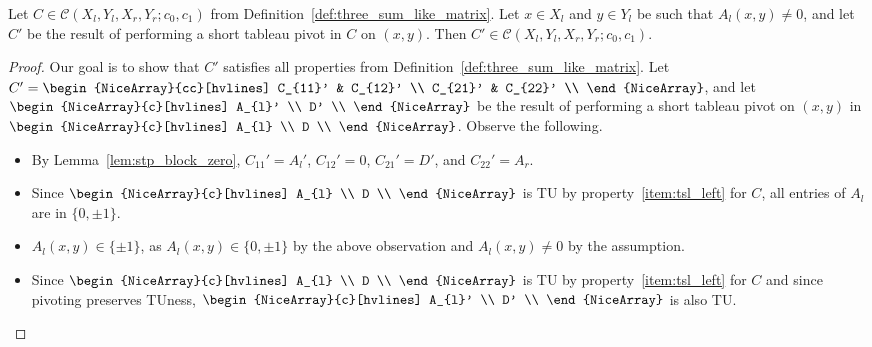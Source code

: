 \begin{lemma}\label{lem:three_sum_like_pivot}
    Let $C \in \mathcal{C} (X_{l}, Y_{l}, X_{r}, Y_{r}; c_{0}, c_{1})$ from Definition~\ref{def:three_sum_like_matrix}. Let $x \in X_{l}$ and $y \in Y_{l}$ be such that $A_{l} (x, y) \neq 0$, and let $C'$ be the result of performing a short tableau pivot in $C$ on $(x, y)$. Then $C' \in \mathcal{C} (X_{l}, Y_{l}, X_{r}, Y_{r}; c_{0}, c_{1})$.
\end{lemma}

\begin{proof}
    Our goal is to show that $C'$ satisfies all properties from Definition~\ref{def:three_sum_like_matrix}. Let $C' = \begin{NiceArray}{cc}[hvlines] C_{11}' & C_{12}' \\ C_{21}' & C_{22}' \\ \end{NiceArray}$, and let $\begin{NiceArray}{c}[hvlines] A_{l}' \\ D' \\ \end{NiceArray}$ be the result of performing a short tableau pivot on $(x, y)$ in $\begin{NiceArray}{c}[hvlines] A_{l} \\ D \\ \end{NiceArray}$. Observe the following.

    \begin{itemize}
        \item By Lemma~\ref{lem:stp_block_zero}, $C_{11}' = A_{l}'$, $C_{12}' = 0$, $C_{21}' = D'$, and $C_{22}' = A_{r}$.
        \item Since $\begin{NiceArray}{c}[hvlines] A_{l} \\ D \\ \end{NiceArray}$ is TU by property~\ref{item:tsl_left} for $C$, all entries of $A_{l}$ are in $\{0, \pm 1\}$.
        \item $A_{l} (x, y) \in \{\pm 1\}$, as $A_{l} (x, y) \in \{0, \pm 1\}$ by the above observation and $A_{l} (x, y) \neq 0$ by the assumption.
        \item Since $\begin{NiceArray}{c}[hvlines] A_{l} \\ D \\ \end{NiceArray}$ is TU by property~\ref{item:tsl_left} for $C$ and since pivoting preserves TUness, $\begin{NiceArray}{c}[hvlines] A_{l}' \\ D' \\ \end{NiceArray}$ is also TU.
    \end{itemize}


\end{proof}

